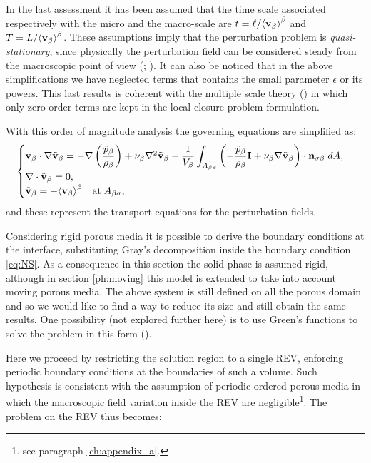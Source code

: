 In the last assessment it has been assumed that the time scale associated respectively with the micro and the macro-scale are $t = \ell/{\left< \textbf{v}_{\beta} \right>}^{\beta}$ and $T =L/{\left< \textbf{v}_{\beta} \right>}^{\beta}$.
These assumptions imply that the perturbation problem is \textit{quasi-stationary}, since physically the perturbation field can be considered steady from the macroscopic point of view (\citet{davit2013homogenization}; \citet{zhu2014study}).
It can also be noticed that in the above simplifications we have neglected terms that contains the small parameter $\epsilon$ or its powers. This last results is coherent with the multiple scale theory (\citet{mei2010homogenization}) in which only zero order terms are kept in the local closure problem formulation.

With this order of magnitude analysis the governing equations are simplified as:
\begin{eqnarray}
	\begin{cases}
		\textbf{v}_{\beta} \cdot \nabla \tilde{\textbf{v}}_{\beta} = -\nabla \left(\dfrac{\tilde{p}_{\beta}}{\rho_{\beta}}\right) + \nu_{\beta} \nabla^2 \tilde{\textbf{v}}_{\beta} - \dfrac{1}{V_\beta} \displaystyle \int_{A_{\beta \sigma}} \left(-\dfrac{\tilde{p}_{\beta}}{\rho_{\beta}} \mathbf{I}  + \nu_{\beta} \nabla \tilde{\textbf{v}}_{\beta} \right) \cdot \mathbf{n}_{\sigma \beta} \;dA,  \\
		\nabla \cdot \tilde{\textbf{v}}_{\beta} = 0,  \\
		\tilde{\textbf{v}}_{\beta} = -{\left< \textbf{v}_{\beta} \right>}^{\beta} \quad \textrm{at} \; A_{\beta \sigma},
	\end{cases}
\label{eq:vans_mom_}
\end{eqnarray}
and these represent the transport equations for the perturbation fields.

Considering rigid porous media it is possible to derive the boundary conditions at the interface, substituting Gray's decomposition inside the boundary condition  \eqref{eq:NS}. As a consequence in this section the solid phase is assumed rigid, although in section \ref{ph:moving} this model is extended to take into account moving porous media.
The above system is still defined on all the porous domain and so we would like to find a way to reduce its size and still obtain the same results.
One possibility (not explored further here) is to use Green's functions to solve the problem in this form (\citet{wood2013volume}).

Here we proceed by restricting the solution region to a single REV, enforcing periodic boundary conditions at the boundaries of such a volume.
Such hypothesis is consistent with the assumption of periodic ordered porous media in which the macroscopic field variation inside the REV are negligible\footnote{see paragraph \ref{ch:appendix_a}.}.
The problem on the REV thus becomes:

